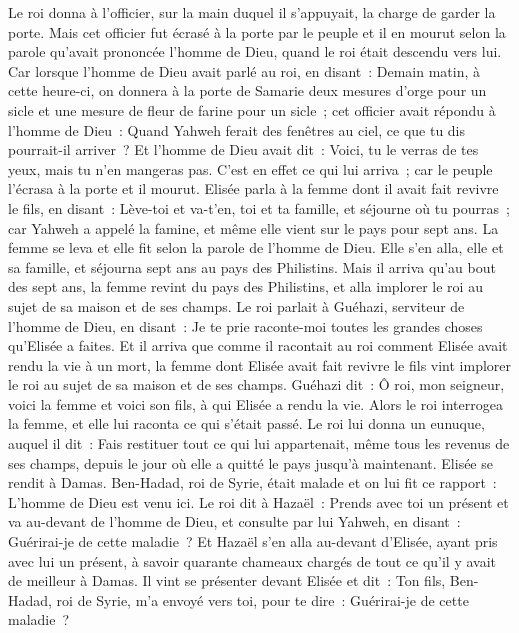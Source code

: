 \begin{multicols}{2}
Le roi donna à l'officier, sur la main duquel il s'appuyait, la charge de garder la porte. Mais cet officier fut écrasé à la porte par le peuple et il en mourut selon la parole qu'avait prononcée l'homme de Dieu, quand le roi était descendu vers lui.
Car lorsque l'homme de Dieu avait parlé au roi, en disant~: Demain matin, à cette heure-ci, on donnera à la porte de Samarie deux mesures d'orge pour un sicle et une mesure de fleur de farine pour un sicle~;
cet officier avait répondu à l'homme de Dieu~: Quand Yahweh ferait des fenêtres au ciel, ce que tu dis pourrait-il arriver~? Et l'homme de Dieu avait dit~: Voici, tu le verras de tes yeux, mais tu n'en mangeras pas.
C'est en effet ce qui lui arriva~; car le peuple l'écrasa à la porte et il mourut.
\VerseOne{}Elisée parla à la femme dont il avait fait revivre le fils, en disant~: Lève-toi et va-t'en, toi et ta famille, et séjourne où tu pourras~; car Yahweh a appelé la famine, et même elle vient sur le pays pour sept ans.
La femme se leva et elle fit selon la parole de l'homme de Dieu. Elle s'en alla, elle et sa famille, et séjourna sept ans au pays des Philistins.
Mais il arriva qu'au bout des sept ans, la femme revint du pays des Philistins, et alla implorer le roi au sujet de sa maison et de ses champs.
Le roi parlait à Guéhazi, serviteur de l'homme de Dieu, en disant~: Je te prie raconte-moi toutes les grandes choses qu'Elisée a faites.
Et il arriva que comme il racontait au roi comment Elisée avait rendu la vie à un mort, la femme dont Elisée avait fait revivre le fils vint implorer le roi au sujet de sa maison et de ses champs. Guéhazi dit~: Ô roi, mon seigneur, voici la femme et voici son fils, à qui Elisée a rendu la vie.
Alors le roi interrogea la femme, et elle lui raconta ce qui s'était passé. Le roi lui donna un eunuque, auquel il dit~: Fais restituer tout ce qui lui appartenait, même tous les revenus de ses champs, depuis le jour où elle a quitté le pays jusqu'à maintenant.
Elisée se rendit à Damas. Ben-Hadad, roi de Syrie, était malade et on lui fit ce rapport~: L'homme de Dieu est venu ici.
Le roi dit à Hazaël~: Prends avec toi un présent et va au-devant de l'homme de Dieu, et consulte par lui Yahweh, en disant~: Guérirai-je de cette maladie~?
Et Hazaël s'en alla au-devant d'Elisée, ayant pris avec lui un présent, à savoir quarante chameaux chargés de tout ce qu'il y avait de meilleur à Damas. Il vint se présenter devant Elisée et dit~: Ton fils, Ben-Hadad, roi de Syrie, m'a envoyé vers toi, pour te dire~: Guérirai-je de cette maladie~?

\end{multicols}
